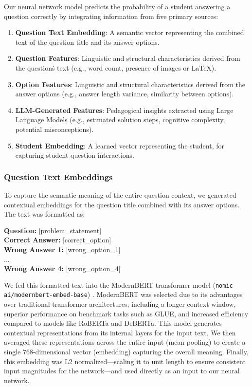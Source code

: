 \documentclass[
    a4paper, %
    10pt, %
    twoside, %
]{LTJournalArticle}
\begin{document}
Our neural network model predicts the probability of a student answering a question correctly by integrating information from five primary sources:

\begin{enumerate}
    \item \textbf{Question Text Embedding}: A semantic vector representing the combined text of the question title and its answer options.
    \item \textbf{Question Features}: Linguistic and structural characteristics derived from the question\'s text (e.g., word count, presence of images or LaTeX).
    \item \textbf{Option Features}: Linguistic and structural characteristics derived from the answer options (e.g., answer length variance, similarity between options).
    \item \textbf{LLM-Generated Features}: Pedagogical insights extracted using Large Language Models (e.g., estimated solution steps, cognitive complexity, potential misconceptions).
    \item \textbf{Student Embedding}: A learned vector representing the student, for capturing student-question interactions.
\end{enumerate}

\subsubsection{Question Text Embeddings}
To capture the semantic meaning of the entire question context, we generated contextual embeddings for the question title combined with its answer options. The text was formatted as:

    \begin{promptbox}
        \textbf{Question:} [problem\_statement]\\
        \textbf{Correct Answer:} [correct\_option]\\
        \textbf{Wrong Answer 1:} [wrong\_option\_1]\\
        ... \\
        \textbf{Wrong Answer 4:} [wrong\_option\_4]
    \end{promptbox}
    
We fed this formatted text into the ModernBERT transformer model (\texttt{nomic-ai/modernbert-embed-base}) \cite{warner2024smarterbetterfasterlonger}. ModernBERT was selected due to its advantages over traditional transformer architectures, including a longer context window, superior performance on benchmark tasks such as GLUE, and increased efficiency compared to models like RoBERTa and DeBERTa. This model generates contextual representations from its internal layers for the input text. We then averaged these representations across the entire input (mean pooling) to create a single 768-dimensional vector (embedding) capturing the overall meaning. Finally, this embedding was L2 normalized—scaling it to unit length to ensure consistent input magnitudes for the network—and used directly as an input to our neural network.
\end{document}
